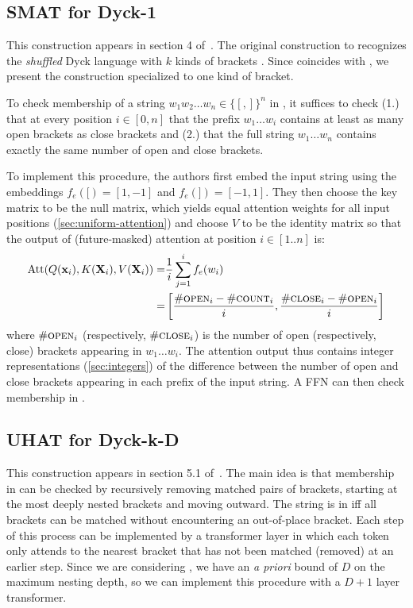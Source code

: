 \subsection{SMAT for Dyck-1}
This construction appears in section 4 of~\citet{bhattamishra2020ability}. The original construction to recognizes the \textit{shuffled} Dyck language with $k$ kinds of brackets . Since  coincides with , we present the construction specialized to one kind of bracket.

To check membership of a string $w_1w_2\ldots w_{n} \in \{[,] \}^n$ in , it suffices to check (1.) that at every position $i \in [0,n]$ that the prefix $w_1 \ldots w_i$ contains at least as many open brackets as close brackets and (2.) that the full string $w_1 \ldots w_n$ contains exactly the same number of open and close brackets.

To implement this procedure, the authors first embed the input string using the embeddings $f_e([) = [1,-1]$ and $f_e(]) = [-1,1]$. They then choose the key matrix to be the null matrix, which yields equal attention weights for all input positions (\cref{sec:uniform-attention}) and choose $V$ to be the identity matrix so that the output of (future-masked) attention at position $i \in [1..n]$ is:\begin{align*}
    \mathrm{Att}(Q(\mathbf{x}_i), K(\mathbf{X}_i), V(\mathbf{X}_i)) = & \frac{1}{i}\sum_{j=1}^i f_e(w_i)\\
    = & \left[ \frac{{\#}\textsc{open}_i - {\#}\textsc{count}_i}{i}, \frac{{\#}\textsc{close}_i - {\#}\textsc{open}_i}{i}\right]
\end{align*}
where ${\#}\textsc{open}_i$ (respectively, ${\#}\textsc{close}_i$) is the number of open (respectively, close) brackets appearing in $w_1\ldots w_i$. The attention output thus contains integer representations (\cref{sec:integers}) of the difference between the number of open and close brackets appearing in each prefix of the input string. A FFN can then check membership in .

\subsection{UHAT for Dyck-k-D}
This construction appears in section 5.1 of~\citet{yao-2021-self-attention}.
The main idea is that membership in  can be checked by recursively removing matched pairs of brackets, starting at the most deeply nested brackets and moving outward. The string is in  iff all brackets can be matched without encountering an out-of-place bracket. Each step of this process can be implemented by a transformer layer in which each token only attends to the nearest bracket that has not been matched (removed) at an earlier step. Since we are considering , we have an \textit{a priori} bound of $D$ on the maximum nesting depth, so we can implement this procedure with a $D+1$ layer transformer. 

